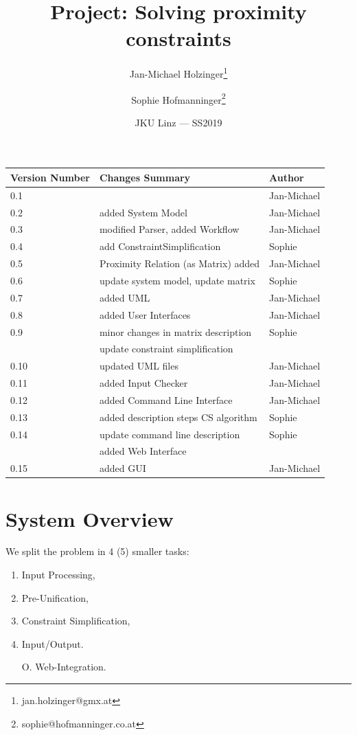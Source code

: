 \documentclass{article}
\title{Project: Solving proximity constraints} %
\author{Jan-Michael Holzinger\thanks{jan.holzinger@gmx.at} \and Sophie Hofmanninger\thanks{sophie@hofmanninger.co.at}} %
\date{JKU Linz --- SS2019} %
\begin{document}
\maketitle %


\begin{center}
\begin{tabular}[h]{|l|l|l|}
\hline
Version Number & Changes Summary & Author\\
\hline
0.1 & & Jan-Michael\\
\hline
0.2 & added System Model & Jan-Michael\\
\hline
0.3 & modified Parser, added Workflow & Jan-Michael\\
\hline
0.4 & add ConstraintSimplification & Sophie\\
\hline
0.5 & Proximity Relation (as Matrix) added & Jan-Michael\\
\hline
0.6 & update system model, update matrix & Sophie\\
\hline
0.7 & added UML & Jan-Michael\\
\hline
0.8 & added User Interfaces & Jan-Michael\\
\hline
0.9 & minor changes in matrix description & Sophie\\
& update constraint simplification&\\
\hline
0.10 & updated UML files & Jan-Michael\\
\hline
0.11 & added Input Checker & Jan-Michael\\
\hline
0.12 & added Command Line Interface & Jan-Michael\\
\hline
0.13 & added description steps CS algorithm & Sophie\\
\hline
0.14 & update command line description & Sophie\\
& added Web Interface&\\
\hline
0.15 & added GUI & Jan-Michael\\
\hline
\end{tabular}

\end{center}
\section{System Overview}

We split the problem in 4 (5) smaller tasks:
\begin{enumerate}
	\item Input Processing,
	\item Pre-Unification,
	\item Constraint Simplification,
	\item Input/Output.
	\item [O.] Web-Integration.
\end{enumerate}
\end{document}
